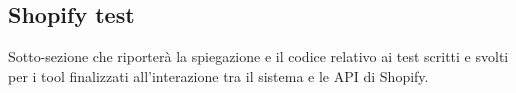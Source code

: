 \subsection{Shopify test}

Sotto-sezione che riporterà la spiegazione e il codice relativo ai test scritti e svolti per i tool finalizzati all'interazione tra il sistema e le API di Shopify.